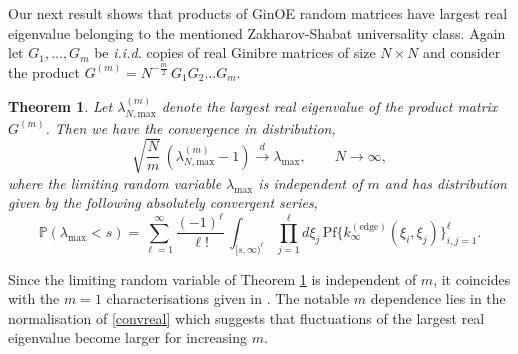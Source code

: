 \documentclass[11pt,reqno]{amsproc}
\newtheorem{theorem}{Theorem}
\numberwithin{equation}{section}
\numberwithin{theorem}{section}
\begin{document}
Our next result shows that products of GinOE random matrices have largest real eigenvalue belonging to the mentioned Zakharov-Shabat universality class. Again let $G_{1}, \ldots, G_{m}$ be \textit{i.i.d.} copies of real Ginibre matrices of size $N \times N$ and consider the product $G^{(m)} = N^{-\frac{m}{2}}\,G_{1}G_{2}\ldots G_{m}$.
\begin{theorem}
\label{th:lambdamax}
Let $\lambda^{(m)}_{N,\mathrm{max}}$ denote the largest real eigenvalue of the product matrix $G^{(m)}$. Then we have the convergence in distribution,
\begin{equation}
\sqrt{\frac{N}{m}}\,\left(\lambda^{(m)}_{N,\mathrm{max}}-1\right) \overset{d}{\longrightarrow}\lambda_{\mathrm{max}}, \qquad N \to \infty, \label{convreal}
\end{equation}
where the limiting random variable $\lambda_{\mathrm{max}}$ is independent of $m$ and has distribution given by the following absolutely convergent series,
\begin{equation}
\mathbb{P}(\lambda_{\mathrm{max}} < s) = \sum_{\ell=1}^{\infty}\frac{(-1)^{\ell}}{\ell!}\,\int_{[s,\infty)^{\ell}}\prod_{j=1}^{\ell}d\xi_{j}\,\mathrm{Pf}\bigg\{k^{(\mathrm{edge})}_{\infty}(\xi_{i},\xi_{j})\bigg\}_{i,j=1}^{\ell}.
\end{equation}
\end{theorem} 
Since the limiting random variable of Theorem \ref{th:lambdamax} is independent of $m$, it coincides with the $m=1$ characterisations given in \cite{BB20}. The notable $m$ dependence lies in the normalisation of \eqref{convreal} which suggests that fluctuations of the largest real eigenvalue become larger for increasing $m$.
\end{document}
